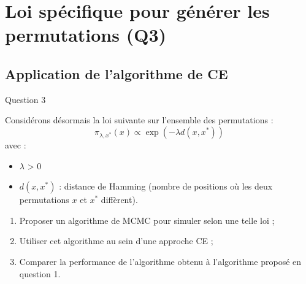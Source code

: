 \documentclass[10pt,xcolor=table,color={dvipsnames,usenames},ignorenonframetext,usepdftitle=false,french]{beamer}
\begin{document}
\hypertarget{loi-spuxe9cifique-pour-guxe9nuxe9rer-les-permutations-q3}{%
\section{Loi spécifique pour générer les permutations
(Q3)}\label{loi-spuxe9cifique-pour-guxe9nuxe9rer-les-permutations-q3}}

\hypertarget{application-de-lalgorithme-de-ce}{%
\subsection{Application de l'algorithme de
CE}\label{application-de-lalgorithme-de-ce}}

\begin{frame}{Question 3 \bccrayon}
\protect\hypertarget{question-3}{}

Considérons désormais la loi suivante sur l'ensemble des permutations :
\[\pi_{\lambda,x^*}(x) \propto \exp{(-\lambda d(x,x^{*}))}\] avec :

\begin{itemize}
\item $\lambda$ > 0
\item $d(x,x^{*})$ : distance de Hamming (nombre de positions où les deux permutations $x$ et $x^{*}$ diffèrent). 
\end{itemize}

\begin{enumerate}
\item Proposer un algorithme de MCMC pour simuler selon une telle loi ;
\item Utiliser cet algorithme au sein d’une approche CE ;
\item Comparer la performance de l’algorithme obtenu à l’algorithme proposé en question 1.
\end{enumerate}

\end{frame}
\end{document}
